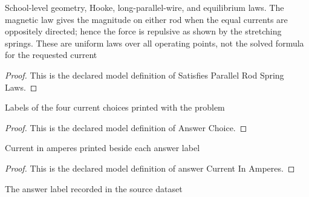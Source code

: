 \begin{definition}
  \label{def:physics:phyx-mini-0968:phyxminiproblems-problemphyxmini0968-satisfiesparallelrodspringlaws}
  School-level geometry, Hooke, long-parallel-wire, and equilibrium laws. The magnetic law gives the magnitude on either rod when the equal currents are oppositely directed; hence the force is repulsive as shown by the stretching springs. These are uniform laws over all operating points, not the solved formula for the requested current
\end{definition}
\begin{proof}
  This is the declared model definition of Satisfies Parallel Rod Spring Laws.
\end{proof}
\begin{definition}
  \label{def:physics:phyx-mini-0968:phyxminiproblems-problemphyxmini0968-answerchoice}
  Labels of the four current choices printed with the problem
\end{definition}
\begin{proof}
  This is the declared model definition of Answer Choice.
\end{proof}
\begin{definition}
  \label{def:physics:phyx-mini-0968:phyxminiproblems-problemphyxmini0968-answercurrentinamperes}
  Current in amperes printed beside each answer label
\end{definition}
\begin{proof}
  This is the declared model definition of answer Current In Amperes.
\end{proof}
\begin{definition}
  \label{def:physics:phyx-mini-0968:phyxminiproblems-problemphyxmini0968-recordeddatasetanswer}
  The answer label recorded in the source dataset
\end{definition}
